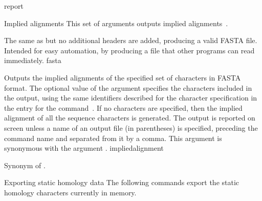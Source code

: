 \begin{command}{report}{}
\begin{arguments}
		\begin{argumentgroup}{Implied alignments}
            {This set of arguments outputs implied alignments~\cite{wheeler2003}.} 

            {The same as  but no additional headers
                are added, producing a valid FASTA file. Intended for easy
                automation, by producing a file that other programs can read
                immediately.}
                {fasta}

                {Outputs the implied alignments of the specified
                set of characters in FASTA format. The optional value of the
                argument specifies the characters included
                in the output, using the same identifiers described for the
                character specification in the entry for the command~. If no
                characters are specified, then the implied alignment of all the
                sequence characters is generated. The output is reported on
                screen unless a name of an output file (in parentheses) is
                specified, preceding the command name and separated from it by a
                comma. This argument is synonymous with the argument
                .}
                {impliedalignment}

                {Synonym of .}
                {}

        \end{argumentgroup}

        \begin{argumentgroup}{Exporting static homology data}
            {The following commands export the static homology characters
            currently in memory.}


\end{argumentgroup}
\end{arguments}
\end{command}
